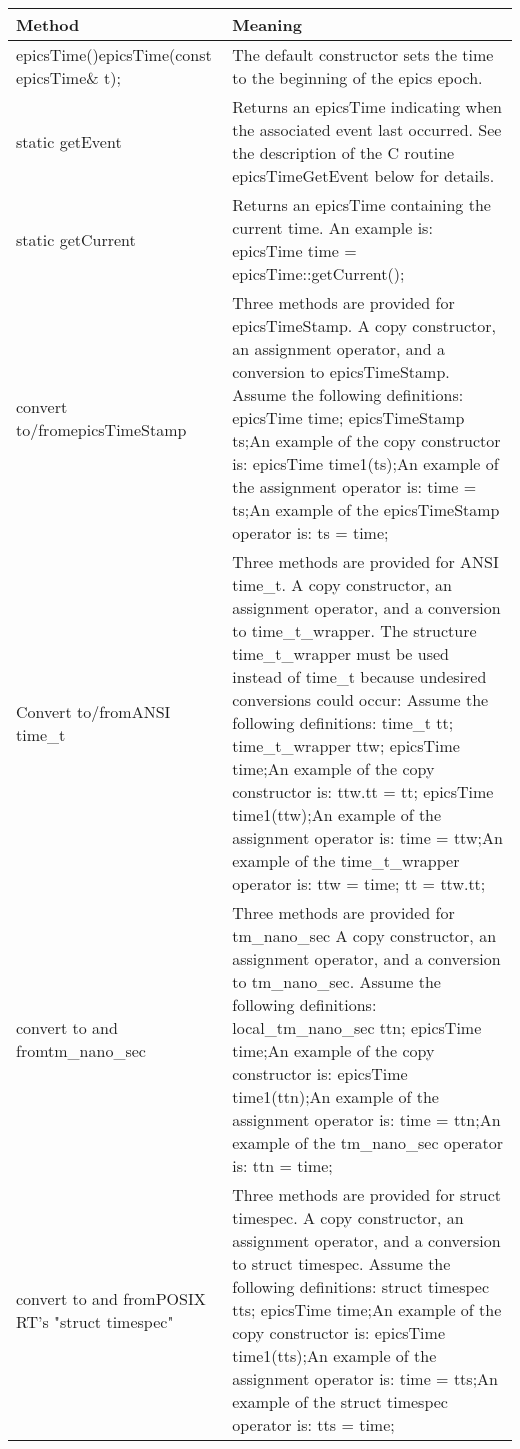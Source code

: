 \begin{center}\begin{longtable}{p{1.95833in}p{4.79167in}}
\textbf{Method} & \textbf{Meaning}\\
\hline
epicsTime()epicsTime(const epicsTime\& t); & The default constructor sets the time to the beginning of the epics epoch.\\
static getEvent & Returns an epicsTime indicating when the associated event last occurred. See the description of the C routine epicsTimeGetEvent below for details.\\
static getCurrent & Returns an epicsTime containing the current time. An example is:    epicsTime time = epicsTime::getCurrent();\\
convert to/fromepicsTimeStamp & Three methods are provided for epicsTimeStamp. A copy constructor, an assignment operator, and a conversion to epicsTimeStamp. Assume the following definitions:    epicsTime time;    epicsTimeStamp ts;An example of the copy constructor is:    epicsTime time1(ts);An example of the assignment operator is:    time = ts;An example of the epicsTimeStamp operator is:    ts = time;\\
Convert to/fromANSI time\_t & Three methods are provided for ANSI time\_t. A copy constructor, an assignment operator, and a conversion to time\_t\_wrapper. The structure time\_t\_wrapper must be used instead of time\_t because undesired conversions could occur: Assume the following definitions:    time\_t tt;    time\_t\_wrapper ttw;    epicsTime time;An example of the copy constructor is:    ttw.tt = tt;    epicsTime time1(ttw);An example of the assignment operator is:    time = ttw;An example of the time\_t\_wrapper operator is:    ttw = time;    tt = ttw.tt;\\
convert to and fromtm\_nano\_sec & Three methods are provided for tm\_nano\_sec A copy constructor, an assignment operator, and a conversion to tm\_nano\_sec. Assume the following definitions:    local\_tm\_nano\_sec ttn;    epicsTime time;An example of the copy constructor is:    epicsTime time1(ttn);An example of the assignment operator is:    time = ttn;An example of the tm\_nano\_sec operator is:    ttn = time;\\
convert to and fromPOSIX RT's "struct timespec" & Three methods are provided for struct timespec. A copy constructor, an assignment operator, and a conversion to struct timespec. Assume the following definitions:    struct timespec tts;    epicsTime time;An example of the copy constructor is:    epicsTime time1(tts);An example of the assignment operator is:    time = tts;An example of the struct timespec operator is:    tts = time;\\

\end{longtable}
\end{center}
